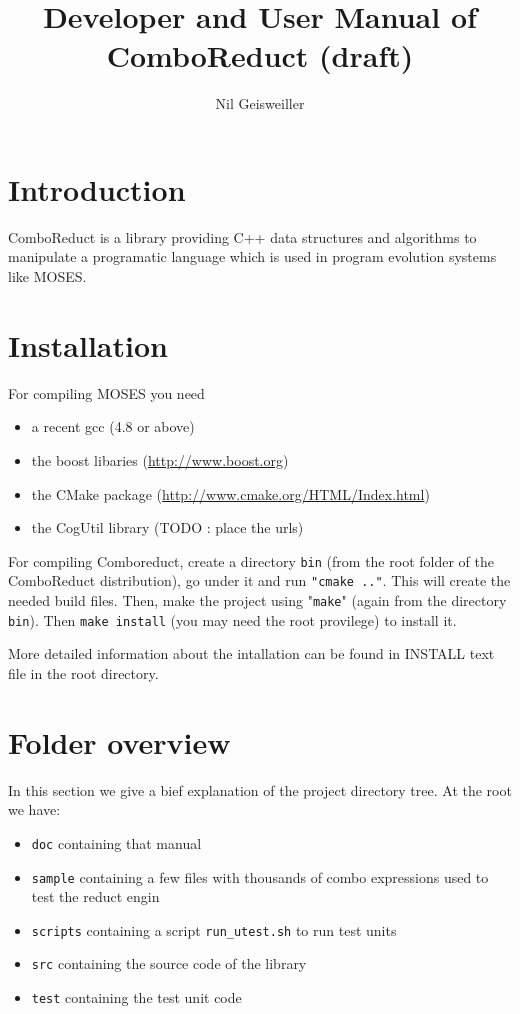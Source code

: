 \documentclass{article}
\title{Developer and User Manual of ComboReduct (draft)}
\author{Nil Geisweiller}
\begin{document}
  
  \maketitle
  
  \tableofcontents
  
  \newpage
  
  \section{Introduction}
  
  ComboReduct is a library providing C++ data structures and algorithms 
  to manipulate a programatic language which is used in program evolution 
  systems like MOSES.
  
  \section{Installation}
  
  For compiling MOSES you need
  \begin{itemize}
  \item a recent gcc (4.8 or above)
  \item the boost libaries (\url{http://www.boost.org})
  \item the CMake package (\url{http://www.cmake.org/HTML/Index.html})
  \item the CogUtil library (TODO : place the urls)
  \end{itemize}
  
  For compiling Comboreduct, create a directory \verb|bin|
  (from the root folder of the ComboReduct distribution), go under it
  and run \verb|"cmake .."|. This will create 
  the needed build files. Then, make the project using "\verb|make|" (again 
  from the directory \verb|bin|). Then \verb|make install| (you may need the
  root provilege) to install it.
  
  More detailed information about the intallation can be found in INSTALL text
  file in the root directory.

  \section{Folder overview}

  In this section we give a bief explanation of the project directory tree.
  At the root we have:
  \begin{itemize}
  \item \verb|doc| containing that manual
  \item \verb|sample| containing a few files with thousands of combo
    expressions used to test the reduct engin
  \item \verb|scripts| containing a script \verb|run_utest.sh| 
    to run test units
  \item \verb|src| containing the source code of the library
  \item \verb|test| containing the test unit code
  \end{itemize}
  
\end{document}
